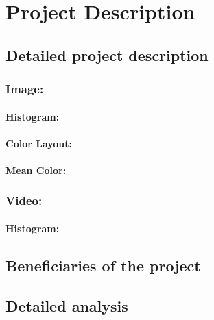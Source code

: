 \chapter{Project Description}
\section{Detailed project description}


\subsection{Image:}

\subsubsection{Histogram:}


\subsubsection{Color Layout:}




\subsubsection{Mean Color:}



\subsection{Video: }
\subsubsection{Histogram:}




\section{Beneficiaries of the project}





\section{Detailed analysis}















